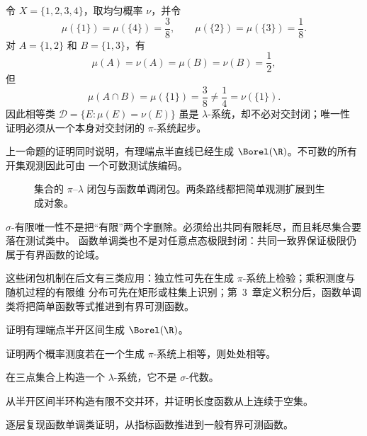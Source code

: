 \begin{example}\label{ex:2-2-1-3}
令 \(X=\{1,2,3,4\}\)，取均匀概率 \(\nu\)，并令
\[
 \mu(\{1\})=\mu(\{4\})=\frac38,\qquad
 \mu(\{2\})=\mu(\{3\})=\frac18.
\]
对 \(A=\{1,2\}\) 和 \(B=\{1,3\}\)，有
\[
 \mu(A)=\nu(A)=\mu(B)=\nu(B)=\frac12,
\]
但
\[
 \mu(A\cap B)=\mu(\{1\})=\frac38
 \ne\frac14=\nu(\{1\}).
\]
因此相等类 \(\mathcal D=\{E:\mu(E)=\nu(E)\}\) 虽是 \(\lambda\)-系统，却不必对交封闭；唯一性
证明必须从一个本身对交封闭的 \(\pi\)-系统起步。
\end{example}

\begin{example}\label{ex:2-2-1-1}
上一命题的证明同时说明，有理端点半直线已经生成 $\Borel(\R)$。不可数的所有开集观测因此可由
一个可数测试族编码。
\end{example}

\begin{figure}[htbp]
\centering
{}
\caption{集合的 $\pi$--$\lambda$ 闭包与函数单调闭包。两条路线都把简单观测扩展到生成对象。}
\label{fig:pi-lambda-monotone-closures}
\end{figure}

\begin{remark}
$\sigma$-有限唯一性不是把“有限”两个字删除。必须给出共同有限耗尽，而且耗尽集合要落在测试类中。
函数单调类也不是对任意点态极限封闭：共同一致界保证极限仍属于有界函数的论域。
\end{remark}

这些闭包机制在后文有三类应用：独立性可先在生成 $\pi$-系统上检验；乘积测度与随机过程的有限维
分布可先在矩形或柱集上识别；第~3~章定义积分后，函数单调类将把简单函数等式推进到有界可测函数。

\begin{exercise}
证明有理端点半开区间生成 $\Borel(\R)$。
\end{exercise}
\begin{exercise}
证明两个概率测度若在一个生成 $\pi$-系统上相等，则处处相等。
\end{exercise}
\begin{exercise}
在三点集合上构造一个 $\lambda$-系统，它不是 $\sigma$-代数。
\end{exercise}
\begin{exercise}
从半开区间半环构造有限不交并环，并证明长度函数从上连续于空集。
\end{exercise}
\begin{exercise}
逐层复现函数单调类证明，从指标函数推进到一般有界可测函数。
\end{exercise}

